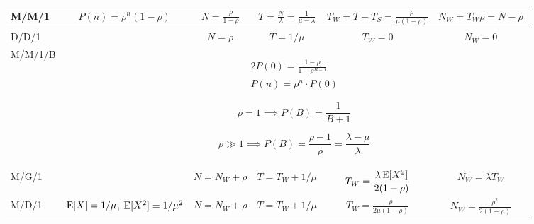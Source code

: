 \documentclass{form}
\begin{document}
\begin{center}
    \begin{tabular}{@{}l || c | c | c | c | c @{}}
        M/M/1   & $\displaystyle P(n) = \rho^n(1-\rho)$   & $\displaystyle N=\frac{\rho}{1-\rho}$ & $\displaystyle T=\frac{N}{\lambda} = \frac{1}{\mu-\lambda}$ & $\displaystyle T_W = T-T_S = \frac{\rho}{\mu(1-\rho)}$ & $\displaystyle N_W = T_W \rho = N-\rho$ \\ \hline
        D/D/1   &                                         & $\displaystyle N=\rho$                & $\displaystyle T=1/\mu$                                     & $\displaystyle T_W = 0$                                & $\displaystyle N_W = 0$                 \\ \hline
        M/M/1/B & \multicolumn{5}{c}{
            \begin{minipage}{0.15\textwidth}
                \vspace{-0.8em}
                \begin{alignat*}{2}
                    P(0) = \frac{1-\rho}{1-\rho^{B+1}} \\
                    P(n) = \rho^n\cdot P(0)
                \end{alignat*}
            \end{minipage}
            \begin{minipage}{0.35\textwidth}
                \vspace{-0.8em}
                \begin{equation*}
                    \rho = 1 \implies P(B) = \frac{1}{B+1}
                \end{equation*}
            \end{minipage}
            \begin{minipage}{0.30\textwidth}
                \vspace{-0.8em}
                \begin{equation*}
                    \rho \gg 1 \implies P(B) = \frac{\rho-1}{\rho} = \frac{\lambda - \mu}{\lambda}
                \end{equation*}
            \end{minipage}
        } \\ \hline
        M/G/1   &                                         & $\displaystyle N=N_W + \rho$                & $\displaystyle T=T_W+1/\mu$                             & $\displaystyle T_W = \frac{\lambda \operatorname{E}[X^2]}{2(1-\rho)}$                    & $\displaystyle N_W = \lambda T_W$                 \\ \hline
        M/D/1   & $\operatorname{E}[X]=1/\mu$, $\operatorname{E}[X^2]=1/\mu^2$ & $\displaystyle N=N_W + \rho$                & $\displaystyle T=T_W+1/\mu$                             & $\displaystyle T_W = \frac{\rho}{2 \mu (1-\rho)}$                    & $\displaystyle N_W = \frac{\rho^2}{2 (1-\rho)}$                 \\
    \end{tabular}
\end{center}
\end{document}
